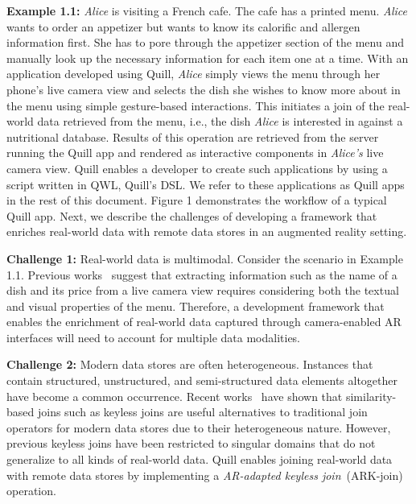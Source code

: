 \documentclass[11pt]{article}
\begin{document}
\textbf{Example 1.1: } \textit{Alice} is visiting a French cafe. The cafe has a printed menu. \textit{Alice} wants to order an appetizer but wants to know its calorific and allergen information first.
She has to pore through the appetizer section of the menu and manually look up the necessary information for each item one at a time. With an application developed using {Quill}, \textit{Alice} simply views the menu through her phone's live camera view and selects the dish she wishes to know more about in the menu using simple gesture-based interactions. This initiates a join of the real-world data retrieved from the menu, i.e., the dish \textit{Alice} is interested in against a nutritional database. 
Results of this operation are retrieved from the server running the Quill app and rendered as interactive components in \textit{Alice's} live camera view.
Quill enables a developer to create such applications by using a script written in QWL, Quill's DSL. We refer to these applications as Quill apps in the rest of this document. Figure 1 demonstrates the workflow of a typical Quill app. Next, we describe the challenges of developing a framework that enriches real-world data with remote data stores in an augmented reality setting.\vspace{0.15cm} 

\label{sec:intro:challeneges}

\newcommand{\challengemultimodal}{1}
\textbf{Challenge 1: } Real-world data is multimodal. Consider the scenario in Example 1.1. Previous works~\cite{sarkhel2019deterministic, sarkhel2019visual,sarkhel2021improving} suggest that extracting information such as the name of a dish and its price from a live camera view requires considering both the textual and visual properties of the menu. Therefore, a development framework that enables the enrichment of real-world data captured through camera-enabled AR interfaces will need to account for multiple data modalities.\vspace{0.07cm} 

\newcommand{\challengehetero}{2}
\textbf{Challenge 2: }
Modern data stores are often heterogeneous. Instances that contain structured, unstructured, and semi-structured data elements altogether have become a common occurrence.
Recent works~\cite{suri2021ember,fernandez2019termite,li2021auto} have shown that similarity-based joins such as keyless joins are useful alternatives to traditional join operators for modern data stores due to their heterogeneous nature.
However, previous keyless joins have been restricted to singular domains that do not generalize to all kinds of real-world data.
Quill enables joining real-world data with remote data stores by implementing a \textit{AR-adapted keyless join}~(ARK-join) operation. \vspace{0.07cm}
\end{document}

